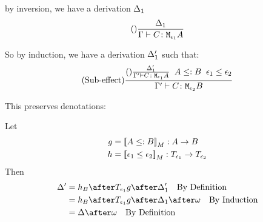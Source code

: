 \documentclass{report}
\begin{document}
    by inversion, we have a derivation $\Delta_1$
    \begin{equation}
        (\text{}) \frac{\Delta_1}{\Gamma \vdash C \colon \texttt{M}_{\epsilon_1}{A}}
    \end{equation}

    So by induction, we have a derivation $\Delta_1'$ such that:
    \begin{equation}
        (\text{Sub-effect}) \frac{(\text{}) \frac{\Delta_1'}{\Gamma' \vdash C \colon \texttt{M}_{\epsilon_1}{A}}\;\; A \leq: B\;\; \epsilon_1\leq\epsilon_2}{\Gamma' \vdash C \colon \texttt{M}_{\epsilon_2}{B}}
    \end{equation}

    This preserves denotations:

    Let
    \begin{align}
        g &= {\bf [\![}A \leq: B{\bf ]\!]}_M: A \rightarrow B\\
        h &= {\bf [\![}\epsilon_1\leq\epsilon_2{\bf ]\!]}_M: T_{\epsilon_1}{}\rightarrow T_{\epsilon_2}{}
    \end{align}
    Then
    \begin{align}
        \D' & = h_B\after\T{\e_1}{g}\after \D_1' \qt{By Definition}\\
        & = h_B\after\T{\e_1}{g}\after \D_1\after\w\qt{By Induction}\\
        & = \D\after\w\qt{By Definition}
    \end{align}
\end{document}
